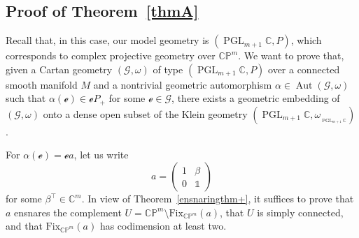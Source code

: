 \documentclass[pdftex]{sigma}
\numberwithin{equation}{section}
\theoremstyle{definition}
\DeclareMathOperator{\Aut}{\mathrm{Aut}}
\DeclareMathOperator{\PGL}{\mathrm{PGL}}
\newcommand{\MC}[1]{\omega_{{}_{#1}}}
\begin{document}
\subsection{Proof of Theorem~\ref{thmA}} Recall that, in this case, our model geometry is $(\PGL_{m+1}\mathbb{C},P)$, which corresponds to complex projective geometry over $\mathbb{CP}^m$. We want to prove that, given a Cartan geometry $(\mathscr{G},\omega)$ of type $(\PGL_{m+1}\mathbb{C},P)$ over a connected smooth manifold $M$ and a nontrivial geometric automorphism $\alpha\in\Aut(\mathscr{G},\omega)$ such that $\alpha(\mathscr{e})\in\mathscr{e}P_+$ for some $\mathscr{e}\in\mathscr{G}$, there exists a geometric embedding of $(\mathscr{G},\omega)$ onto a dense open subset of the Klein geometry $(\PGL_{m+1}\mathbb{C},\MC{\PGL_{m+1}\mathbb{C}})$.

For $\alpha(\mathscr{e})=\mathscr{e}a$, let us write \[a=\begin{pmatrix}1 & \beta \\ 0 & \mathds{1}\end{pmatrix}\] for some $\beta^\top\in\mathbb{C}^m$. In view of Theorem~\ref{ensnaringthm+}, it suffices to prove that $a$ ensnares the complement $U=\mathbb{CP}^m\setminus\mathrm{Fix}_{\mathbb{CP}^m}(a)$, that $U$ is simply connected, and that $\mathrm{Fix}_{\mathbb{CP}^m}(a)$ has codimension at least two.
\end{document}
